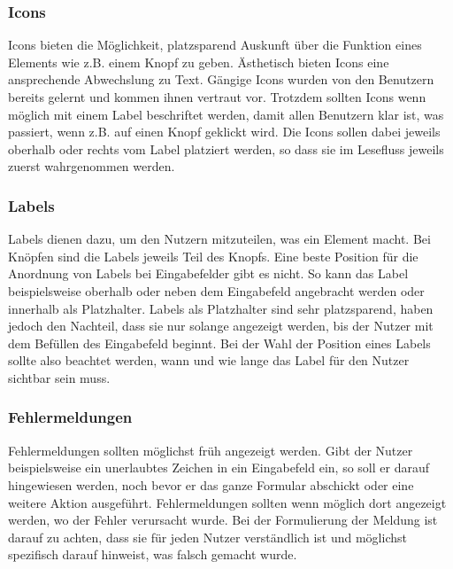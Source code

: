 \subsubsection{Icons}
Icons bieten die Möglichkeit, platzsparend Auskunft über die Funktion eines Elements wie z.B. einem Knopf zu geben.
Ästhetisch bieten Icons eine ansprechende Abwechslung zu Text.
Gängige Icons wurden von den Benutzern bereits gelernt und kommen ihnen vertraut vor.
Trotzdem sollten Icons wenn möglich mit einem Label beschriftet werden, damit allen Benutzern klar ist, was passiert, wenn z.B. auf einen Knopf geklickt wird.
Die Icons sollen dabei jeweils oberhalb oder rechts vom Label platziert werden, so dass sie im Lesefluss jeweils zuerst wahrgenommen werden.

\subsubsection{Labels}
Labels dienen dazu, um den Nutzern mitzuteilen, was ein Element macht.
Bei Knöpfen sind die Labels jeweils Teil des Knopfs.
Eine beste Position für die Anordnung von Labels bei Eingabefelder gibt es nicht.
So kann das Label beispielsweise oberhalb oder neben dem Eingabefeld angebracht werden oder innerhalb als Platzhalter.
Labels als Platzhalter sind sehr platzsparend, haben jedoch den Nachteil, dass sie nur solange angezeigt werden, bis der Nutzer mit dem Befüllen des Eingabefeld beginnt.
Bei der Wahl der Position eines Labels sollte also beachtet werden, wann und wie lange das Label für den Nutzer sichtbar sein muss.

\subsubsection{Fehlermeldungen}
Fehlermeldungen sollten möglichst früh angezeigt werden.
Gibt der Nutzer beispielsweise ein unerlaubtes Zeichen in ein Eingabefeld ein, so soll er darauf hingewiesen werden, noch bevor er das ganze Formular abschickt oder eine weitere Aktion ausgeführt.
Fehlermeldungen sollten wenn möglich dort angezeigt werden, wo der Fehler verursacht wurde.
Bei der Formulierung der Meldung ist darauf zu achten, dass sie für jeden Nutzer verständlich ist und möglichst spezifisch darauf hinweist, was falsch gemacht wurde.

